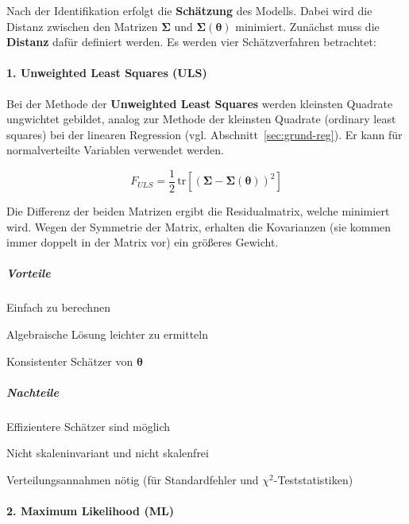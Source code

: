 \documentclass{article}
\numberwithin{equation}{section}
\begin{document}
Nach der Identifikation erfolgt die \textbf{Schätzung} des Modells. Dabei wird die Distanz zwischen den Matrizen $\boldsymbol \Sigma$ und $\boldsymbol \Sigma (\boldsymbol \theta)$ minimiert. Zunächst muss die \textbf{Distanz} dafür definiert werden. Es werden vier Schätzverfahren betrachtet:

\paragraph*{1. Unweighted Least Squares (ULS)}

Bei der Methode der \textbf{Unweighted Least Squares} werden kleinsten Quadrate ungwichtet gebildet, analog zur Methode der kleinsten Quadrate (ordinary least squares) bei der linearen Regression (vgl. Abschnitt~\ref{sec:grund-reg}). Er kann für normalverteilte Variablen verwendet werden.

\begin{equation}
F_{ULS} = \frac{1}{2}\, \text{tr} \left[ \left( \boldsymbol \Sigma - \boldsymbol \Sigma (\boldsymbol \theta) \right)^2 \right]
\end{equation}

Die Differenz der beiden Matrizen ergibt die Residualmatrix, welche minimiert wird. Wegen der Symmetrie der Matrix, erhalten die Kovarianzen (sie kommen immer doppelt in der Matrix vor) ein größeres Gewicht.

\subparagraph*{Vorteile}

\begin{compactitem}
\item Einfach zu berechnen
\item Algebraische Lösung leichter zu ermitteln
\item Konsistenter Schätzer von $\boldsymbol \theta$
\end{compactitem}

\subparagraph*{Nachteile}

\begin{compactitem}
\item Effizientere Schätzer sind möglich
\item Nicht skaleninvariant und nicht skalenfrei
\item Verteilungsannahmen nötig (für Standardfehler und $\chi^2$-Teststatistiken)
\end{compactitem}

\paragraph*{2. Maximum Likelihood (ML)}
\end{document}
